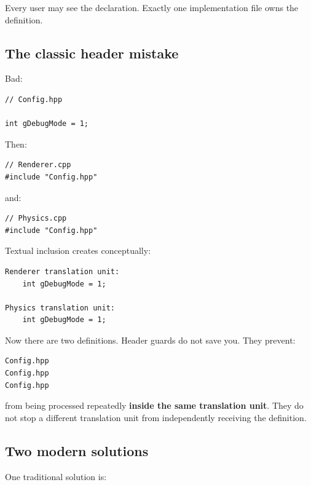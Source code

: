 Every user may see the declaration. Exactly one implementation file owns the definition.

\subsection{The classic header mistake}\label{05-engine-i-ch002-the-classic-header-mistake}

\hypertarget{05-engine-i-ch002-the-classic-header-mistake}{}

Bad:

\begin{verbatim}
// Config.hpp

int gDebugMode = 1;
\end{verbatim}

Then:

\begin{verbatim}
// Renderer.cpp
#include "Config.hpp"
\end{verbatim}

and:

\begin{verbatim}
// Physics.cpp
#include "Config.hpp"
\end{verbatim}

Textual inclusion creates conceptually:

\begin{verbatim}
Renderer translation unit:
    int gDebugMode = 1;

Physics translation unit:
    int gDebugMode = 1;
\end{verbatim}

Now there are two definitions. Header guards do not save you. They prevent:

\begin{verbatim}
Config.hpp
Config.hpp
Config.hpp
\end{verbatim}

from being processed repeatedly \textbf{inside the same translation unit}. They do not stop a different translation unit from independently receiving the definition.

\subsection{Two modern solutions}\label{05-engine-i-ch002-two-modern-solutions}

\hypertarget{05-engine-i-ch002-two-modern-solutions}{}

One traditional solution is:

